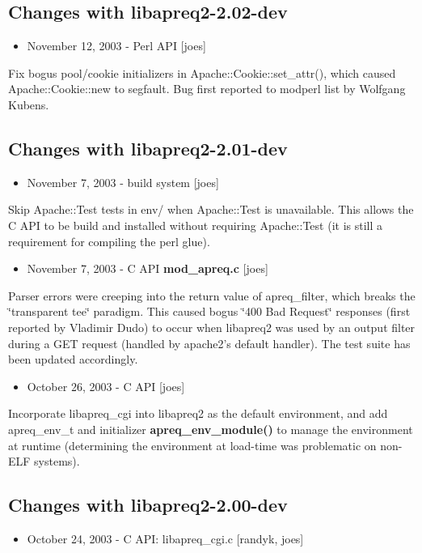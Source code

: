 \subsection{Changes with libapreq2-2.02-dev}\label{v2_02_dev}
\begin{itemize}
\item November 12, 2003 - Perl API [joes]\end{itemize}


Fix bogus pool/cookie initializers in Apache::Cookie::set\_\-attr(), which caused Apache::Cookie::new to segfault. Bug first reported to modperl list by Wolfgang Kubens.\subsection{Changes with libapreq2-2.01-dev}\label{v2_01_dev}
\begin{itemize}
\item November 7, 2003 - build system [joes]\end{itemize}


Skip Apache::Test tests in env/ when Apache::Test is unavailable. This allows the C API to be build and installed without requiring Apache::Test (it is still a requirement for compiling the perl glue).

\begin{itemize}
\item November 7, 2003 - C API {\bf mod\_\-apreq.c} [joes]\end{itemize}


Parser errors were creeping into the return value of apreq\_\-filter, which breaks the \char`\"{}transparent tee\char`\"{} paradigm. This caused bogus \char`\"{}400 Bad Request\char`\"{} responses (first reported by Vladimir Dudo) to occur when libapreq2 was used by an output filter during a GET request (handled by apache2's default handler). The test suite has been updated accordingly.

\begin{itemize}
\item October 26, 2003 - C API [joes]\end{itemize}


Incorporate libapreq\_\-cgi into libapreq2 as the default environment, and add apreq\_\-env\_\-t and initializer {\bf apreq\_\-env\_\-module()} to manage the environment at runtime (determining the environment at load-time was problematic on non-ELF systems).\subsection{Changes with libapreq2-2.00-dev}\label{v2_0_0}
\begin{itemize}
\item October 24, 2003 - C API: libapreq\_\-cgi.c [randyk, joes]\end{itemize}


